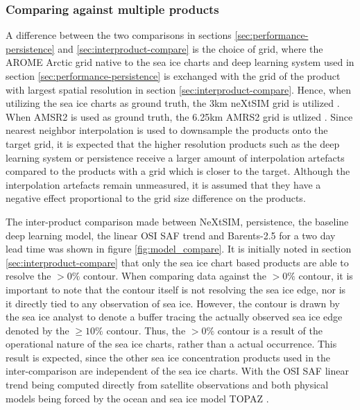 \documentclass[../main/thesis]{subfiles}
\begin{document}
\subsubsection{Comparing against multiple products}
A difference between the two comparisons in sections \ref{sec:performance-persistence} and \ref{sec:interproduct-compare} is the choice of grid, where the AROME Arctic grid native to the sea ice charts and deep learning system used in section \ref{sec:performance-persistence} is exchanged with the grid of the product with largest spatial resolution in section \ref{sec:interproduct-compare}. Hence, when utilizing the sea ice charts as ground truth, the 3km neXtSIM grid is utilized \citep{Williams2021}. When AMSR2 is used as ground truth, the 6.25km AMRS2 grid is utlized \citep{Spreen2008}. Since nearest neighbor interpolation is used to downsample the products onto the target grid, it is expected that the higher resolution products such as the deep learning system or persistence receive a larger amount of interpolation artefacts compared to the products with a grid which is closer to the target. Although the interpolation artefacts remain unmeasured, it is assumed that they have a negative effect proportional to the grid size difference on the products.

The inter-product comparison made between NeXtSIM, persistence, the baseline deep learning model, the linear OSI SAF trend and Barents-2.5 for a two day lead time was shown in figure \ref{fig:model_compare}. It is initially noted in section \ref{sec:interproduct-compare} that only the sea ice chart based products are able to resolve the $>0\%$ contour. When comparing data against the $> 0\%$ contour, it is important to note that the contour itself is not resolving the sea ice edge, nor is it directly tied to any observation of sea ice. However, the contour is drawn by the sea ice analyst to denote a buffer tracing the actually observed sea ice edge denoted by the $\geq 10\%$ contour. Thus, the $> 0\%$ contour is a result of the operational nature of the sea ice charts, rather than a actual occurrence. This result is expected, since the other sea ice concentration products used in the inter-comparison are independent of the sea ice charts. With the OSI SAF linear trend being computed directly from satellite observations \citep{Tonboe2017} and both physical models being forced by the ocean and sea ice model TOPAZ \citep{Sakov2012}.
\end{document}
